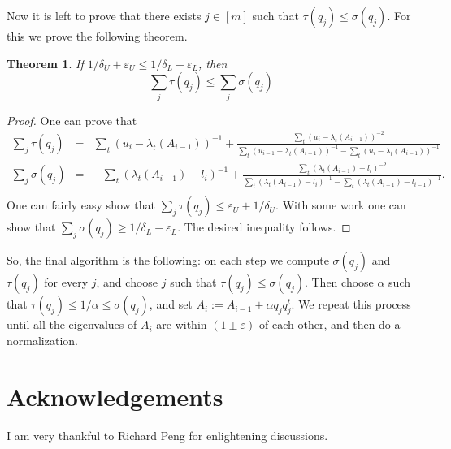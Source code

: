 \documentclass[12pt]{article}
\newcommand{\eps}{\varepsilon}
\newtheorem{theorem}{Theorem}
\begin{document}
    Now it is left to prove that there exists $j \in [m]$ such that $\tau(q_j) \leq \sigma(q_j)$.
    For this we prove the following theorem.

    \begin{theorem}
        If $1 / \delta_U + \eps_U \leq 1 / \delta_L - \eps_L$, then
        $$
            \sum_j \tau(q_j) \leq \sum_j \sigma(q_j)
        $$
    \end{theorem}
    \begin{proof}
        One can prove that
        \begin{eqnarray*}
            \sum_j \tau(q_j) &=& \sum_{t}(u_i - \lambda_t(A_{i-1}))^{-1} + \frac{\sum_t(u_i - \lambda_t(A_{i-1}))^{-2}}
            {\sum_t (u_{i-1} - \lambda_t(A_{i-1}))^{-1} - \sum_t (u_i - \lambda_t(A_{i-1}))^{-1}}\\
            \sum_j \sigma(q_j) &=& -\sum_t(\lambda_t(A_{i-1}) - l_i)^{-1} + \frac{\sum_t(\lambda_t(A_{i-1}) - l_i)^{-2}}
            {\sum_t(\lambda_t(A_{i-1}) - l_i)^{-1} - \sum_t(\lambda_t(A_{i-1}) - l_{i-1})^{-1}}.\\
        \end{eqnarray*}
        One can fairly easy show that $\sum_j \tau(q_j) \leq \eps_U + 1 / \delta_U$. With some work
        one can show that $\sum_j \sigma(q_j) \geq 1 / \delta_L - \eps_L$. The desired inequality follows.
    \end{proof}

    So, the final algorithm is the following: on each step we compute $\sigma(q_j)$ and $\tau(q_j)$ for every
    $j$, and choose $j$ such that $\tau(q_j) \leq \sigma(q_j)$. Then choose $\alpha$ such that
    $\tau(q_j) \leq 1 / \alpha \leq \sigma(q_j)$, and set $A_i := A_{i-1} + \alpha q_j q_j^t$.
    We repeat this process until all the eigenvalues of $A_i$ are within $(1 \pm \eps)$ of each other, and then do a
    normalization.

    \section{Acknowledgements}

    I am very thankful to Richard Peng for enlightening discussions.
    
    
\end{document}
